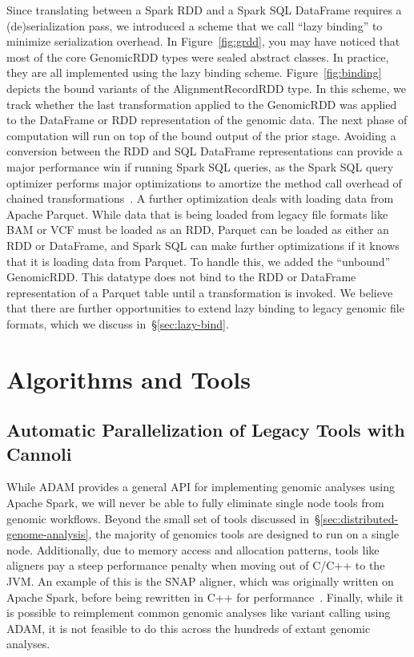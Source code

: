 \documentclass[phd]{ucbthesis}
\begin{document}
Since translating between a {Spark} RDD and a {Spark SQL}
DataFrame requires a (de)serialization pass, we introduced a scheme that we call
``lazy binding'' to minimize serialization overhead. In Figure~\ref{fig:grdd},
you may have noticed that most of the core {GenomicRDD} types were
sealed abstract classes. In practice, they are all implemented using the lazy
binding scheme. Figure~\ref{fig:binding} depicts the bound variants of the
{AlignmentRecordRDD} type. In this scheme, we track whether the last
transformation applied to the {GenomicRDD} was applied to the DataFrame
or RDD representation of the genomic data. The next phase of computation will
run on top of the bound output of the prior stage. Avoiding a conversion between the RDD and SQL DataFrame representations can provide a major
performance win if running {Spark SQL} queries, as the {Spark SQL}
query optimizer performs major optimizations to amortize the method call
overhead of chained transformations~\cite{armbrust15}. A further optimization
deals with loading data from {Apache Parquet}. While data that is being
loaded from legacy file formats like BAM or VCF must be loaded as an RDD,
{Parquet} can be loaded as either an RDD or DataFrame, and {Spark
  SQL} can make further optimizations if it knows that it is loading data from
{Parquet}. To handle this, we added the ``unbound'' {GenomicRDD}.
This datatype does not bind to the RDD or DataFrame representation of a
{Parquet} table until a transformation is invoked. We believe that there
are further opportunities to extend lazy binding to legacy genomic file formats,
which we discuss in~\S\ref{sec:lazy-bind}.

\part{Algorithms and Tools}

\chapter{Automatic Parallelization of Legacy Tools with {Cannoli}}
\label{chap:cannoli}

While {ADAM} provides a general API for implementing genomic analyses
using {Apache Spark}, we will never be able to fully eliminate single
node tools from genomic workflows. Beyond the small set of tools discussed
in~\S\ref{sec:distributed-genome-analysis}, the majority of genomics tools are
designed to run on a single node. Additionally, due to memory access and
allocation patterns, tools like aligners pay a steep performance penalty when
moving out of C/C++ to the JVM. An example of this is the {SNAP} aligner,
which was originally written on {Apache Spark}, before being rewritten in
C++ for performance~\cite{zaharia11}. Finally, while it is possible to
reimplement common genomic analyses like variant calling using {ADAM}, it
is not feasible to do this across the hundreds of extant genomic analyses.
\end{document}
